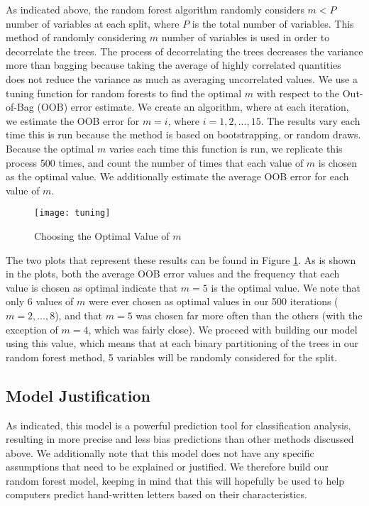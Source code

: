 \documentclass{svproc}
\begin{document}
As indicated above, the random forest algorithm randomly considers $m<P$ number of variables at each split, where $P$ is the total number of variables. This method of randomly considering $m$ number of variables is used in order to decorrelate the trees. The process of decorrelating the trees decreases the variance more than bagging because taking the average of highly correlated quantities does not reduce the variance as much as averaging uncorrelated values. We use a tuning function for random forests to find the optimal $m$ with respect to the Out-of-Bag (OOB) error estimate. We create an algorithm, where at each iteration, we estimate the OOB error for $m=i$, where $i=1,2,...,15$. The results vary each time this is run because the method is based on bootstrapping, or random draws. Because the optimal $m$ varies each time this function is run, we replicate this process 500 times, and count the number of times that each value of $m$ is chosen as the optimal value. We additionally estimate the average OOB error for each value of $m$. 

\begin{figure}
\begin{center}
\caption{Choosing the Optimal Value of $m$}
\texttt{[image: tuning]}
\label{tuning}
\smallskip
\end{center}
\end{figure}

The two plots that represent these results can be found in Figure \ref{tuning}. As is shown in the plots, both the average OOB error values and the frequency that each value is chosen as optimal indicate that $m=5$ is the optimal value. We note that only 6 values of $m$ were ever chosen as optimal values in our 500 iterations ($m=2,...,8$), and that $m=5$ was chosen far more often than the others (with the exception of $m=4$, which was fairly close). We proceed with building our model using this value, which means that at each binary partitioning of the trees in our random forest method, 5 variables will be randomly considered for the split.

\subsection{Model Justification}

As indicated, this model is a powerful prediction tool for classification analysis, resulting in more precise and less bias predictions than other methods discussed above. We additionally note that this model does not have any specific assumptions that need to be explained or justified. We therefore build our random forest model, keeping in mind that this will hopefully be used to help computers predict hand-written letters based on their characteristics. 
\end{document}
